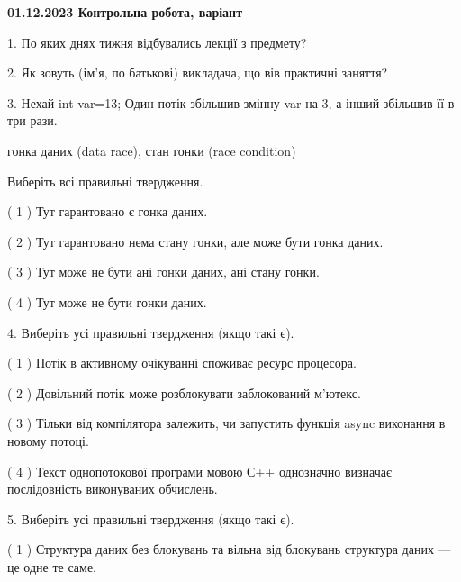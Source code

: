 \documentclass[12pt, ukrainian]{article}
\begin{document}
\vspace{4mm}
\newpage
\begin {large}

\textbf{01.12.2023 Контрольна робота, варіант  }\par


{
1. По яких днях тижня відбувались лекції з предмету?



\vspace{5mm}
2. Як зовуть (ім'я, по батькові) викладача, що вів практичні заняття?



\vspace{5mm}
3. Нехай int var=13; Один потік збільшив змінну var на 3, а інший збільшив її в три рази.

гонка даних (data race), стан гонки (race condition)

Виберіть всі правильні твердження.\par
\vspace{2mm}
( 1 ) Тут гарантовано є гонка даних.%

( 2 ) Тут гарантовано нема стану гонки, але може бути гонка даних.%

( 3 ) Тут може не бути ані гонки даних, ані стану гонки.%

( 4 ) Тут може не бути гонки даних.%


\vspace{5mm}
4. Виберіть усі правильні твердження (якщо такі є).\par
\vspace{2mm}

( 1 ) Потік в активному очікуванні споживає ресурс процесора.%

( 2 ) Довільний потік може розблокувати заблокований м’ютекс.%

( 3 ) Тільки від компілятора залежить, чи запустить функція async виконання в новому потоці.%

( 4 ) Текст однопотокової програми мовою С++ однозначно визначає послідовність виконуваних обчислень.%


\vspace{5mm}
5. Виберіть усі правильні твердження (якщо такі є).\par
\vspace{2mm}

( 1 ) Структура даних без блокувань та вільна від блокувань структура даних --- це одне те саме.%

}
\end{large}
\end{document}
